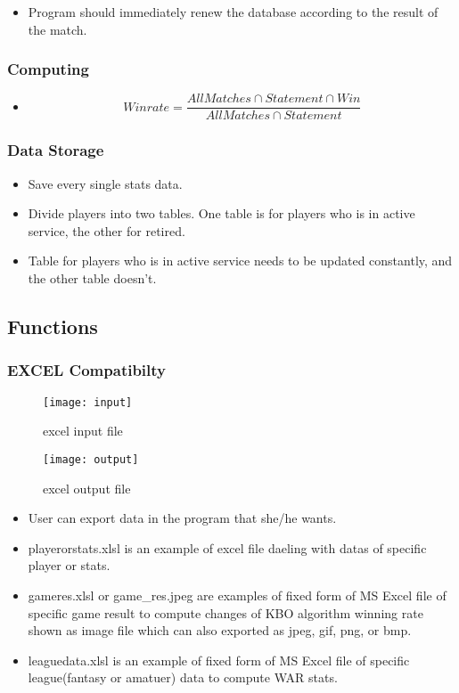 \documentclass[conference,compsoc, twocolumn]{IEEEtran}
\begin{document}
\begin{itemize}
\item Program should immediately renew the database according to the result of the match.
\end{itemize}


\subsubsection{Computing}
\begin{itemize}
\item \begin{equation} \label{eq:winrate} Winrate = \frac{All Matches\cap Statement\cap Win}{All Matches\cap Statement} \end{equation}
\end{itemize}



\subsubsection{Data Storage}
\begin{itemize}
\item Save every single stats data.
\item Divide players  into two tables. One table is for players who is in active service, the other for retired.
\item Table for players who is in active service needs to be updated constantly, and the other table doesn’t.
\end{itemize}



\subsection{Functions}

\subsubsection{EXCEL Compatibilty}
\begin{figure}[h]
\centering\texttt{[image: input]}
\caption{excel input file}
\end{figure}

\begin{figure}[h]
\centering\texttt{[image: output]}
\caption{excel output file}
\end{figure}


\begin{itemize}
\item User can export data in the program that she/he wants.
\item playerorstats.xlsl is an example of excel file daeling with datas of specific player or stats.
\item gameres.xlsl or game_res.jpeg are examples of fixed form of MS Excel file of specific game result to compute changes of KBO algorithm winning rate shown as image file which can also exported as jpeg, gif, png, or bmp.
\item leaguedata.xlsl is an example of fixed form of MS Excel file of specific league(fantasy or amatuer) data to compute WAR stats.
\end{itemize}
\end{document}
